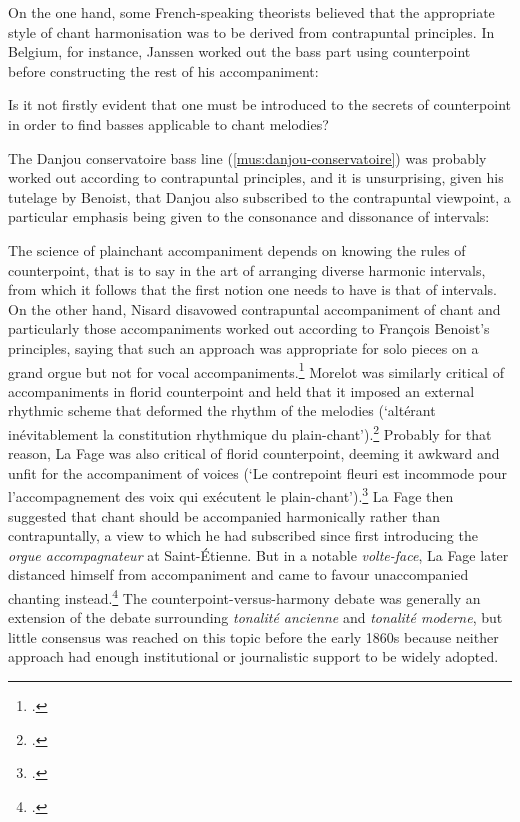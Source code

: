 On the one hand, some French-speaking theorists believed that the appropriate style of chant harmonisation was to be derived from contrapuntal principles.
In Belgium, for instance, Janssen worked out the bass part using counterpoint before constructing the rest of his accompaniment:

  {\cite[207]{Janssenvraisprincipeschant1845}}
{Is it not firstly evident that one must be introduced to the secrets of counterpoint in order to find basses applicable to chant melodies?}

\pagebreak{}
\noindent
The Danjou conservatoire bass line (\cref{mus:danjou-conservatoire}) was probably worked out according to contrapuntal principles, and it is unsurprising, given his tutelage by Benoist, that Danjou also subscribed to the contrapuntal viewpoint, a particular emphasis being given to the consonance and dissonance of intervals:

  {\cite[5--6]{Danjouaccompagnementplainchant1848}}
{The science of plainchant accompaniment depends on knowing the rules of counterpoint, that is to say in the art of arranging diverse harmonic intervals, from which it follows that the first notion one needs to have is that of intervals.}
\noindent
On the other hand, Nisard disavowed contrapuntal accompaniment of chant and particularly those accompaniments worked out according to François Benoist's principles, saying that such an approach was appropriate for solo pieces on a grand orgue but not for vocal accompaniments.\footcite[41]{Nisardvraisprincipesaccompagnement1860}
Morelot was similarly critical of accompaniments in florid counterpoint and held that it imposed an external rhythmic scheme that deformed the rhythm of the melodies (`altérant inévitablement la constitution rhythmique du plain-chant').\footcite[69]{MorelotElementsharmonieappliquee1861}
%
Probably for that reason, La Fage was also critical of florid counterpoint, deeming it awkward and unfit for the accompaniment of voices (`Le contrepoint fleuri est incommode pour l'accompagnement des voix qui exécutent le plain-chant').\footcite[622]{LaFageCourscompletplainchant1856}
La Fage then suggested that chant should be accompanied harmonically rather than contrapuntally, a view to which he had subscribed since first introducing the \emph{orgue accompagnateur} at Saint-Étienne.
%
\label{ln:lafage_unaccomp}%
But in a notable \emph{volte-face}, La Fage later distanced himself from accompaniment and came to favour unaccompanied chanting instead.\footcite[141]{LaFagereproductionlivresplainchant1853}
The counterpoint-versus-harmony debate was generally an extension of the debate surrounding \emph{tonalité ancienne} and \emph{tonalité moderne}, but little consensus was reached on this topic before the early 1860s because neither approach had enough institutional or journalistic support to be widely adopted.

